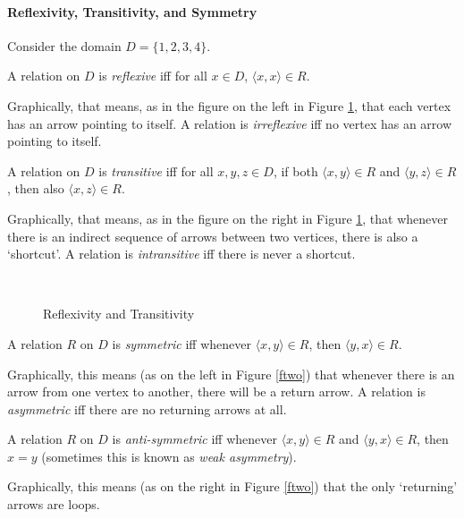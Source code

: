 \paragraph{Reflexivity, Transitivity, and Symmetry}
Consider the domain $D=\{1,2,3,4\}$.
\begin{definition}[Reflexive]
  A relation on $D$ is \emph{reflexive} iff for all $x\in D$, $\langle x,x\rangle\in R$. 
\end{definition} Graphically, that means, as in the figure on the left in Figure \ref{fone}, that each vertex has an arrow pointing to itself. A relation is \emph{irreflexive} iff no vertex has an arrow pointing to itself.
\begin{definition}[Transitive]
  A relation on $D$ is \emph{transitive} iff for all $x,y,z\in D$, if both $\langle x,y\rangle\in R$ and $\langle y,z\rangle\in R$, then also $\langle x,z\rangle\in R$.
\end{definition} Graphically, that means, as in the figure on the right in Figure \ref{fone}, that whenever there is an indirect sequence of arrows between two vertices, there is also a `shortcut'. A relation is \emph{intransitive} iff there is never a shortcut.
\begin{figure}
\begin{center}
  {~\qquad\qquad}{}
\end{center}  \caption{Reflexivity and Transitivity\label{fone}}
\end{figure}
\begin{definition}[Symmetric]
  A relation $R$ on $D$ is \emph{symmetric} iff whenever $\langle x,y\rangle \in R$, then $\langle y,x\rangle \in R$.
\end{definition} Graphically, this means (as on the left in Figure \ref{ftwo}) that whenever there is an arrow from one vertex to another, there will be a return arrow. A relation is \emph{asymmetric} iff there are no returning arrows at all.
\begin{definition}
  A relation $R$ on $D$ is \emph{anti-symmetric} iff whenever $\langle x,y\rangle \in R$ and $\langle y,x\rangle \in R$, then $x=y$ (sometimes this is known as \emph{weak asymmetry}).
\end{definition} Graphically, this means (as on the right in Figure \ref{ftwo}) that the only `returning' arrows are loops.
